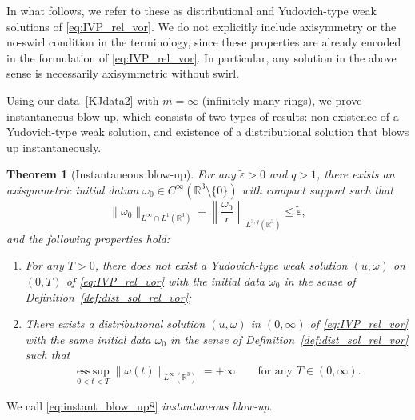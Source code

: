 \documentclass[reqno,11pt]{amsart}
\newtheorem{theorem}{Theorem}[section]
\begin{document}
In what follows, we refer to these as distributional and Yudovich-type weak solutions of \eqref{eq:IVP_rel_vor}. We do not explicitly include axisymmetry or the no-swirl condition in the terminology, since these properties are already encoded in the formulation of \eqref{eq:IVP_rel_vor}. In particular, any solution in the above sense is necessarily axisymmetric without swirl.

Using our data~\eqref{KJdata2} with $m=\infty$ (infinitely many rings), we prove instantaneous blow-up, which consists of two types of results: non-existence of a Yudovich-type weak solution, and existence of a distributional solution that blows up instantaneously.

\begin{theorem}[Instantaneous blow-up]
\label{thm:instant_blow-up}
For any \(\widetilde{\varepsilon}>0\) and \(q>1\), there exists an axisymmetric initial datum
\(\omega_0\in C^\infty(\mathbb{R}^3\setminus \{0\})\) with compact support such that
\[
\|\omega_0\|_{L^\infty\cap L^1(\mathbb{R}^3)}
+\left\|\frac{\omega_0}{r}\right\|_{L^{3,q}(\mathbb{R}^3)}
\le \widetilde{\varepsilon},
\]
and the following  properties hold: 
\begin{enumerate}
\item 
For any $T>0$, there does not exist a Yudovich-type weak solution $(u,\omega)$ on $(0,T)$ of \eqref{eq:IVP_rel_vor} with the initial data $\omega_0$
in the sense of Definition~\ref{def:dist_sol_rel_vor};
\item 
There exists a distributional solution $(u,\omega)$ in $(0,\infty)$ of \eqref{eq:IVP_rel_vor} with the same initial data $\omega_0$ in the sense of Definition~\ref{def:dist_sol_rel_vor} such that
    \begin{align}
    \label{eq:instant_blow_up8}
        \operatorname*{ess \,sup}_{0<t<T}
        \|\omega(t)\|_{L^{\infty}(\mathbb{R}^3)}
        =+\infty
        \qquad 
        \text{for any }T\in (0,\infty).
    \end{align}
\end{enumerate}
\end{theorem}






We call \eqref{eq:instant_blow_up8} \emph{instantaneous blow-up}. 
\end{document}
